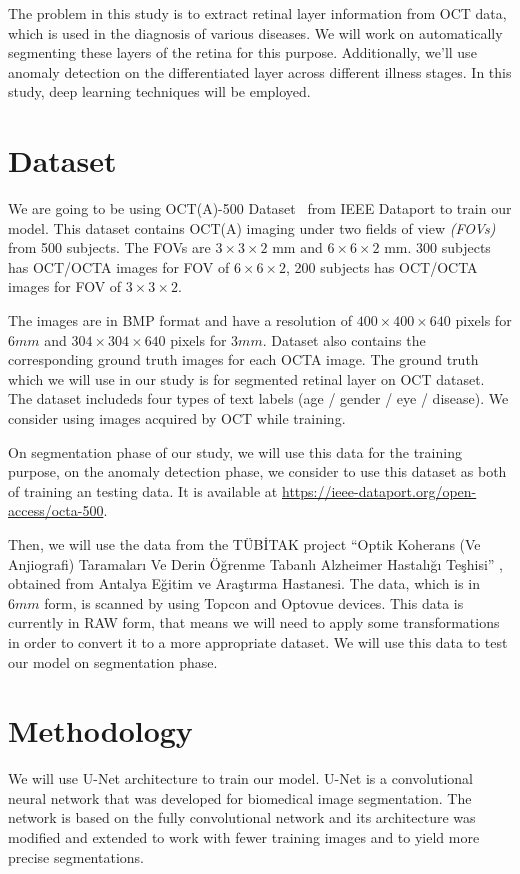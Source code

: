 \documentclass[conference]{IEEEtran}
\begin{document}
The problem in this study is to extract retinal layer information from OCT data, which is used in the diagnosis of various diseases.  We will work on automatically segmenting these layers of the retina for this purpose. Additionally, we'll use anomaly detection on the differentiated layer across different illness stages. In this study, deep learning techniques will be employed.

\section{Dataset}
We are going to be using OCT(A)-500 Dataset \cite{b3} from IEEE Dataport to train our model. This dataset contains OCT(A) imaging under two fields of view \textit{(FOVs)} from 500 subjects. The FOVs are $3\times3\times2$ mm and $6\times6\times2$ mm. 300 subjects has OCT/OCTA images for FOV of $6\times6\times2$, 200 subjects has OCT/OCTA images for FOV of $3\times3\times2$.

The images are in BMP format and have a resolution of $400\times400\times640$ pixels for $6mm$ and $304\times304\times640$ pixels for $3mm$. Dataset also contains the corresponding ground truth images for each OCTA image. The ground truth which we will use in our study is for segmented retinal layer on OCT dataset. The dataset includeds four types of text labels (age / gender / eye / disease). We consider using images acquired by OCT while training.

On segmentation phase of our study, we will use this data for the training purpose, on the anomaly detection phase, we consider to use this dataset as both of training an testing data. It is available at \href{https://ieee-dataport.org/open-access/octa-500}{https://ieee-dataport.org/open-access/octa-500}.

Then, we will use the data from the TÜBİTAK project ``Optik Koherans (Ve Anjiografi) Taramaları Ve Derin Öğrenme Tabanlı Alzheimer Hastalığı Teşhisi'' \cite{b4}, obtained from Antalya Eğitim ve Araştırma Hastanesi. The data, which is in $6mm$ form, is scanned by using Topcon and Optovue devices. This data is currently in RAW form, that means we will need to apply some transformations in order to convert it to a more appropriate dataset. We will use this data to test our model on segmentation phase. 

\section{Methodology}
We will use U-Net architecture to train our model. U-Net is a convolutional neural network that was developed for biomedical image segmentation. The network is based on the fully convolutional network and its architecture was modified and extended to work with fewer training images and to yield more precise segmentations.
\end{document}
